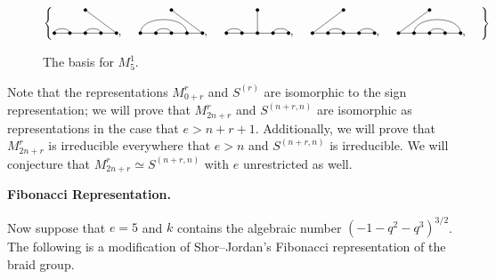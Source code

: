 \documentclass{amsart}
\newcommand{\fakesubsection}[1]{
    \vspace{7pt}
    \noindent \textbf{#1.}
  }
\begin{document}
  \begin{figure} 
    \def\cbasisspacing{5mm}
    \begin{adjustbox}{width=\textwidth}
    $\cbr{
      \begin{gathered}
        \GeneralizedMatching{5}{1/2, 3/4}{1}{5/1}{3/4}, \hspace{\cbasisspacing}
        \GeneralizedMatching{5}{1/4, 2/3}{1}{5/1}{3/4}, \hspace{\cbasisspacing}
        \GeneralizedMatching{5}{1/2, 4/5}{1}{3/1}{3/4}, \hspace{\cbasisspacing}
        \GeneralizedMatching{5}{2/3, 4/5}{1}{1/1}{3/4}, \hspace{\cbasisspacing}
        \GeneralizedMatching{5}{2/5, 3/4}{1}{1/1}{3/4}, \hspace{\cbasisspacing}
       \end{gathered}}$ 
     \end{adjustbox}
       \caption{The basis for $M_5^1$.}
    \label{S5 Basis}
   \end{figure} 

  Note that the representations $M_{0 + r}^r$ and $S^{(r)}$ are isomorphic to the sign representation; 
  we will prove that $M_{2n+r}^r$ and $S^{(n+r,n)}$ are isomorphic as representations in the case that $e > n + r + 1$.
  Additionally, we will prove that $M_{2n + r}^r$ is irreducible everywhere that $e > n$ and $S^{(n+r,n)}$ is irreducible.
  We will conjecture that $M_{2n + r}^r \simeq S^{(n+r,n)}$ with $e$ unrestricted as well.
    
  \def\vara{\alpha_1}
  \def\varb{\alpha_2}
  \def\varc{\varepsilon_1}
  \def\vard{\delta}
  \def\vare{\varepsilon_2}
  \def\vs{\texttt{*}}
  \def\vp{\texttt{0}}
  \fakesubsection{Fibonacci Representation}
  Now suppose that $e = 5$ and $k$ contains the algebraic number $(-1 - q^2 - q^3)^{3/2}$.
  The following is a modification of Shor--Jordan's Fibonacci representation of the braid group.
 
\end{document}

